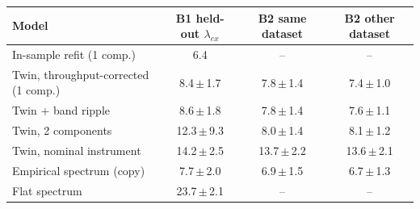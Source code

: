 \begin{tabular}{lccc}
\toprule
Model & B1 held-out $\lambda_{ex}$ & B2 same dataset & B2 other dataset \\
\midrule
In-sample refit (1 comp.) & 6.4 & -- & -- \\
Twin, throughput-corrected (1 comp.) & 8.4\,$\pm$\,1.7 & 7.8\,$\pm$\,1.4 & 7.4\,$\pm$\,1.0 \\
Twin + band ripple & 8.6\,$\pm$\,1.8 & 7.8\,$\pm$\,1.4 & 7.6\,$\pm$\,1.1 \\
Twin, 2 components & 12.3\,$\pm$\,9.3 & 8.0\,$\pm$\,1.4 & 8.1\,$\pm$\,1.2 \\
Twin, nominal instrument & 14.2\,$\pm$\,2.5 & 13.7\,$\pm$\,2.2 & 13.6\,$\pm$\,2.1 \\
Empirical spectrum (copy) & 7.7\,$\pm$\,2.0 & 6.9\,$\pm$\,1.5 & 6.7\,$\pm$\,1.3 \\
Flat spectrum & 23.7\,$\pm$\,2.1 & -- & -- \\
\bottomrule
\end{tabular}